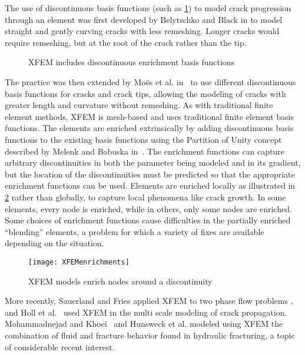The use of discontinuous basis functions (such as \cref{fig:CrackEnrich}) to model crack progression through an element was first developed by Belytschko and Black in \cite{belytschko1999elastic} to model straight and gently curving cracks with less remeshing.
Longer cracks would require remeshing, but at the root of the crack rather than the tip.
\begin{figure}[h]
  \centering
  \scalebox{.55}{}
  \caption{XFEM includes discontinuous enrichment basis functions}
  \label{fig:CrackEnrich}
\end{figure}
The practice was then extended by Mo\"es et al. in~\cite{dolbow1999finite} to use different discontinuous basis functions for cracks and crack tips, allowing the modeling of cracks with greater length and curvature without remeshing.
As with traditional finite element methods, XFEM is mesh-based and uses traditional finite element basis functions.
The elements are enriched extrinsically by adding discontinuous basis functions to the existing basis functions using the Partition of Unity concept described by Melenk and Babuska in~\cite{melenk1996partition}.
The enrichment functions can capture arbitrary discontinuities in both the parameter being modeled and in its gradient, but the location of the discontinuities must be predicted so that the appropriate enrichment functions can be used.
Elements are enriched locally as illustrated in \cref{fig:XFEM} rather than globally, to capture local phenomena like crack growth.
In some elements, every node is enriched, while in others, only some nodes are enriched.
Some choices of enrichment functions cause difficulties in the partially enriched ``blending'' elements, a problem for which a variety of fixes are available depending on the situation.



%
\begin{figure}[h]
  \centering
\texttt{[image: XFEMenrichments]}
\caption[XFEM models enrich nodes around a discontinuity]{XFEM models enrich nodes around a discontinuity\cite{fries2010extended}}
\label{fig:XFEM}
\end{figure}
%

More recently, Sauerland and Fries applied XFEM to two phase flow problems \cite{sauerland2013stable}, and Holl et al.~\cite{holl2013adaptive} used XFEM in the multi scale modeling of crack propagation.
Mohammadnejad and Khoei~\cite{mohammadnejad2013hydro} and Hunsweck et al. \cite{hunsweck2013finite} modeled using XFEM the combination of fluid and fracture behavior found in hydraulic fracturing, a topic of considerable recent interest.

